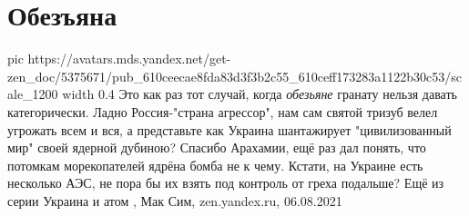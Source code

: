  
 
 
 
 
\chapter{Обезъяна}
\label{sec:slova.obezjana}

\ifcmt
  pic https://avatars.mds.yandex.net/get-zen_doc/5375671/pub_610ceecae8fda83d3f3b2c55_610ceff173283a1122b30c53/scale_1200
  width 0.4
\fi
Это как раз тот случай, когда \emph{обезьяне} гранату нельзя давать
категорически.  Ладно Россия-"страна агрессор", нам сам святой тризуб велел
угрожать всем и вся, а представьте как Украина шантажирует "цивилизованный мир"
своей ядерной дубиною? Спасибо Арахамии, ещё раз дал понять, что потомкам
морекопателей ядрёна бомба не к чему. Кстати, на Украине есть несколько АЭС, не
пора бы их взять под контроль от греха подальше? Ещё из серии Украина и атом
, 
Мак Сим, zen.yandex.ru, 06.08.2021
